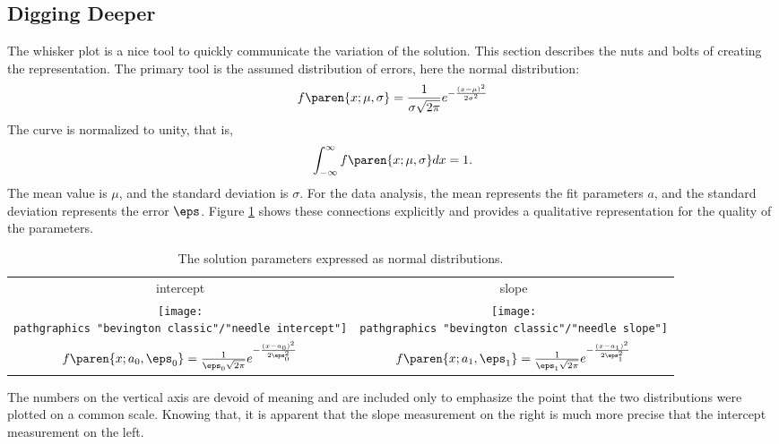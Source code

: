 \subsection{Digging Deeper}  %
The whisker plot is a nice tool to quickly communicate the variation of the solution. This section describes the nuts and bolts of creating the representation. The primary tool is the assumed distribution of errors, here the normal distribution:
  \begin{equation*}   %
    f\paren{x;\mu,\sigma} = \frac{1}{\sigma \sqrt{2\pi}} e^{-\frac{(x-\mu)^{2}}{2\sigma^{2}}}
  \end{equation*}
The curve is normalized to unity, that is,
  \begin{equation*}   %
      \int_{-\infty}^{\infty} f\paren{x;\mu,\sigma} dx = 1.
  \end{equation*}
The mean value is $\mu$, and the standard deviation is $\sigma$. For the data analysis, the mean represents the fit parameters $a$, and the standard deviation represents the error $\eps$. Figure \ref{tab:dev normal} shows these connections explicitly and provides a qualitative representation for the quality of the parameters.
\begin{table}[htbp]  %
    \caption{The solution parameters expressed as normal distributions.}
    \begin{center}
        \begin{tabular}{cc}
            intercept & slope \\
            \texttt{[image: \\pathgraphics "bevington classic"/"needle intercept"]} &
            \texttt{[image: \\pathgraphics "bevington classic"/"needle slope"]} \\
            $f\paren{x;a_{0},\eps_{0}} = \frac{1}{\eps_{0} \sqrt{2\pi}} e^{-\frac{(x - a_{0})^{2}}{2\eps_{0}^{2}}}$ &
            $f\paren{x;a_{1},\eps_{1}} = \frac{1}{\eps_{1} \sqrt{2\pi}} e^{-\frac{(x - a_{1})^{2}}{2\eps_{1}^{2}}}$ \\
        \end{tabular}
    \end{center}
    \label{tab:dev normal}
\end{table}%

The numbers on the vertical axis are devoid of meaning and are included only to emphasize the point that the two distributions were plotted on a common scale. Knowing that, it is apparent that the slope measurement on the right is much more precise that the intercept measurement on the left.

